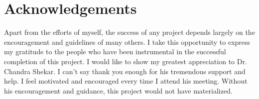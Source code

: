 \chapter*{\centering Acknowledgements}
\quad Apart from the efforts of myself, the success of any project depends largely on the encouragement and guidelines of many others.
I take this opportunity to express my gratitude to the people who have been instrumental in the successful completion of this project.
I would like to show my greatest appreciation to Dr. Chandra Shekar. I can’t say thank you enough for his tremendous support and help.
I feel motivated and encouraged every time I attend his meeting.
Without his encouragement and guidance, this project would not have materialized.